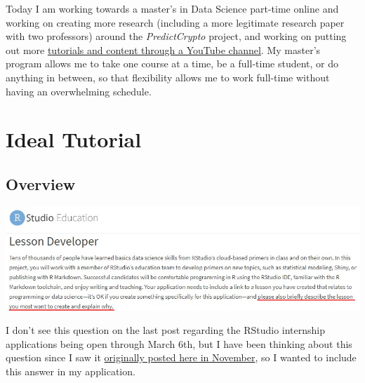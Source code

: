 \documentclass[
]{book}
\begin{document}
Today I am working towards a master's in Data Science part-time online and working on creating more research (including a more legitimate research paper with two professors) around the \emph{PredictCrypto} project, and working on putting out more \href{https://www.youtube.com/channel/UCZKbm8LERZBe_hwJNwroCPg?view_as=subscriber}{tutorials and content through a YouTube channel}. My master's program allows me to take one course at a time, be a full-time student, or do anything in between, so that flexibility allows me to work full-time without having an overwhelming schedule.

\hypertarget{ideal-tutorial}{%
\chapter{Ideal Tutorial}\label{ideal-tutorial}}

\hypertarget{overview-1}{%
\section{Overview}\label{overview-1}}

\includegraphics{images/idealTutorial.png}

I don't see this question on the last post regarding the RStudio internship applications being open through March 6th, but I have been thinking about this question since I saw it \href{https://education.rstudio.com/blog/2019/11/rstudio-internships-2020-preview/}{originally posted here in November}, so I wanted to include this answer in my application.
\end{document}
